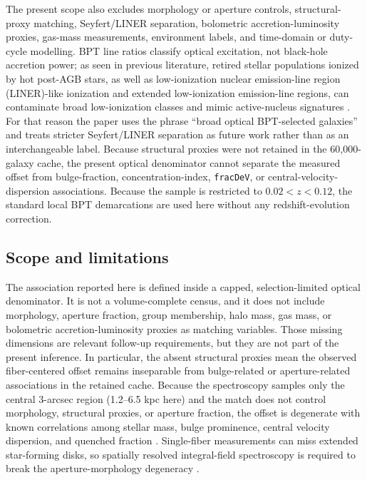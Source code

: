 \documentclass[twocolumn]{aastex631}
\begin{document}
The present scope also excludes morphology or aperture controls, structural-proxy matching, Seyfert/LINER separation, bolometric accretion-luminosity proxies, gas-mass measurements, environment labels, and time-domain or duty-cycle modelling. BPT line ratios classify optical excitation, not black-hole accretion power; as seen in previous literature, retired stellar populations ionized by hot post-AGB stars, as well as low-ionization nuclear emission-line region (LINER)-like ionization and extended low-ionization emission-line regions, can contaminate broad low-ionization classes and mimic active-nucleus signatures \citep{cidfernandes2011,stasinska2008,stasinska2015,belfiore2016}. For that reason the paper uses the phrase ``broad optical BPT-selected galaxies'' and treats stricter Seyfert/LINER separation as future work rather than as an interchangeable label. Because structural proxies were not retained in the 60,000-galaxy cache, the present optical denominator cannot separate the measured offset from bulge-fraction, concentration-index, \texttt{fracDeV}, or central-velocity-dispersion associations. Because the sample is restricted to $0.02<z<0.12$, the standard local BPT demarcations are used here without any redshift-evolution correction.

\subsection{Scope and limitations}
The association reported here is defined inside a capped, selection-limited optical denominator. It is not a volume-complete census, and it does not include morphology, aperture fraction, group membership, halo mass, gas mass, or bolometric accretion-luminosity proxies as matching variables. Those missing dimensions are relevant follow-up requirements, but they are not part of the present inference. In particular, the absent structural proxies mean the observed fiber-centered offset remains inseparable from bulge-related or aperture-related associations in the retained cache. Because the spectroscopy samples only the central 3-arcsec region (1.2--6.5 kpc here) and the match does not control morphology, structural proxies, or aperture fraction, the offset is degenerate with known correlations among stellar mass, bulge prominence, central velocity dispersion, and quenched fraction \citep{schawinski2010,bluck2014,piotrowska2022}. Single-fiber measurements can miss extended star-forming disks, so spatially resolved integral-field spectroscopy is required to break the aperture-morphology degeneracy \citep{penny2018,cheung2016,bundy2015,canodiaz2016}.
\end{document}

